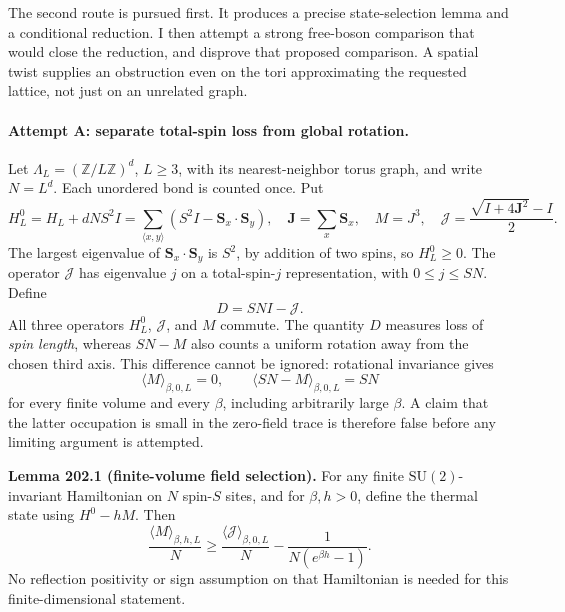 \documentclass[11pt]{article}
\newcommand{\Z}{\mathbb{Z}}
\begin{document}
	The second route is pursued first. It produces a precise state-selection
	lemma and a conditional reduction. I then attempt a strong free-boson
	comparison that would close the reduction, and disprove that proposed
	comparison. A spatial twist supplies an obstruction even on the tori
	approximating the requested lattice, not just on an unrelated graph.
	
	\paragraph{Attempt A: separate total-spin loss from global rotation.}
	Let $\Lambda_L=(\Z/L\Z)^d$, $L\geq3$, with its nearest-neighbor torus
	graph, and write $N=L^d$. Each unordered bond is counted once. Put
	\begin{equation}\label{ra30006979:operators}
		H^0_L=H_L+dNS^2I
		=\sum_{\langle x,y\rangle}(S^2I-\mathbf S_x\cdot\mathbf S_y),
		\quad \mathbf J=\sum_x\mathbf S_x,\quad M=J^3,
		\quad \mathcal J=\frac{\sqrt{I+4\mathbf J^2}-I}{2}.
	\end{equation}
	The largest eigenvalue of $\mathbf S_x\cdot\mathbf S_y$ is $S^2$,
	by addition of two spins, so $H^0_L\geq0$. The operator $\mathcal J$
	has eigenvalue $j$ on a total-spin-$j$ representation, with
	$0\leq j\leq SN$. Define
	\[
	D=SN I-\mathcal J.
	\]
	All three operators $H^0_L$, $\mathcal J$, and $M$ commute. The
	quantity $D$ measures loss of \emph{spin length}, whereas $SN-M$ also
	counts a uniform rotation away from the chosen third axis. This
	difference cannot be ignored: rotational invariance gives
	\begin{equation}\label{ra30006979:zeromode}
		\langle M\rangle_{\beta,0,L}=0,
		\qquad \langle SN-M\rangle_{\beta,0,L}=SN
	\end{equation}
	for every finite volume and every $\beta$, including arbitrarily large
	$\beta$. A claim that the latter occupation is small in the zero-field
	trace is therefore false before any limiting argument is attempted.
	
	\textbf{Lemma 202.1 (finite-volume field selection).}
	For any finite $\mathrm{SU}(2)$-invariant Hamiltonian on $N$ spin-$S$
	sites, and for $\beta,h>0$, define the thermal state using
	$H^0-hM$. Then
	\begin{equation}\label{ra30006979:selection}
		\frac{\langle M\rangle_{\beta,h,L}}{N}
		\geq \frac{\langle\mathcal J\rangle_{\beta,0,L}}{N}
		-\frac{1}{N(e^{\beta h}-1)}.
	\end{equation}
	No reflection positivity or sign assumption on that Hamiltonian is
	needed for this finite-dimensional statement.
	
\end{document}
